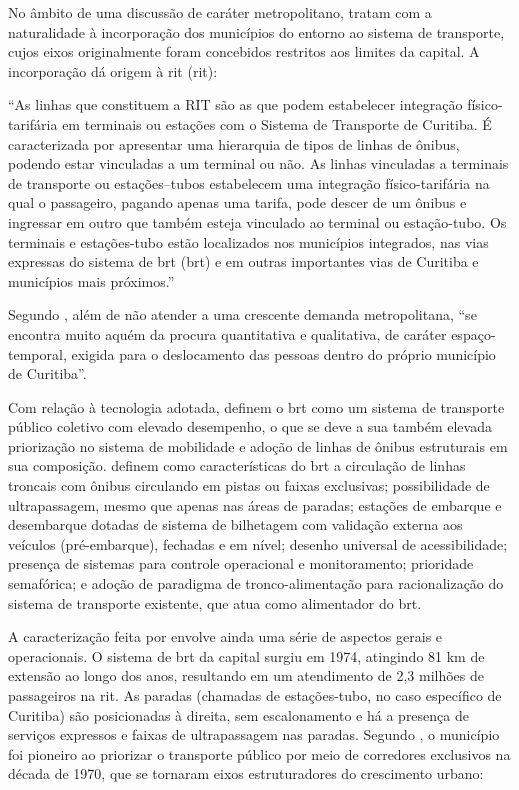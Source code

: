 	No âmbito de uma discussão de caráter metropolitano,  tratam com a naturalidade à incorporação dos municípios do entorno ao sistema de transporte, cujos eixos originalmente foram concebidos restritos aos limites da capital. A incorporação dá origem à \glsdesc{rit} (\gls{rit}):
	
	\begin{citacao}
		``As linhas que constituem a RIT são as que podem estabelecer integração físico-tarifária em terminais ou estações com o Sistema de Transporte de Curitiba. É caracterizada por apresentar uma hierarquia de tipos de linhas de ônibus, podendo estar vinculadas a um terminal ou não. As linhas vinculadas a terminais de transporte ou estações--tubos estabelecem uma integração físico-tarifária na qual o passageiro, pagando apenas uma tarifa, pode descer de um ônibus e ingressar em outro que também esteja vinculado ao terminal ou estação-tubo. Os terminais e estações-tubo estão localizados nos municípios integrados, nas vias expressas do sistema de \glsdesc{brt} (\gls{brt}) e em outras importantes vias de Curitiba e municípios mais próximos.'' \cite[p. 376]{paese2014a}
	\end{citacao}
	
	Segundo , além de não atender a uma crescente demanda metropolitana, ``se encontra muito aquém da procura quantitativa e qualitativa, de caráter espaço-temporal, exigida para o deslocamento das pessoas dentro do próprio município de Curitiba''.
	
	Com relação à tecnologia adotada,  definem o \gls{brt} como um sistema de transporte público coletivo com elevado desempenho, o que se deve a sua também elevada priorização no sistema de mobilidade e adoção de linhas de ônibus estruturais em sua composição.  definem como características do \gls{brt} a circulação de linhas troncais com ônibus circulando em pistas ou faixas exclusivas; possibilidade de ultrapassagem, mesmo que apenas nas áreas de paradas; estações de embarque e desembarque dotadas de sistema de bilhetagem com validação externa aos veículos (pré-embarque), fechadas e em nível; desenho universal de acessibilidade; presença de sistemas para controle operacional e monitoramento; prioridade semafórica; e adoção de paradigma de tronco-alimentação para racionalização do sistema de transporte existente, que atua como alimentador do \gls{brt}.
	
	A caracterização feita por  envolve ainda uma série de aspectos gerais e operacionais. O sistema de \glsdesc{brt} da capital surgiu em 1974, atingindo 81 km de extensão ao longo dos anos, resultando em um atendimento de 2,3 milhões de passageiros na \gls{rit}. As paradas (chamadas de estações-tubo, no caso específico de Curitiba) são posicionadas à direita, sem escalonamento e há a presença de serviços expressos e faixas de ultrapassagem nas paradas. Segundo , o município foi pioneiro ao priorizar o transporte público por meio de corredores exclusivos na década de 1970, que se tornaram eixos estruturadores do crescimento urbano:
	
